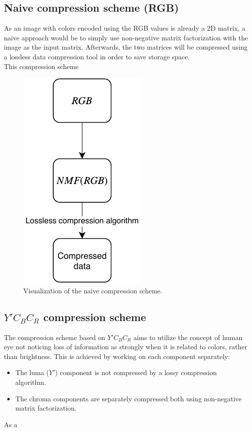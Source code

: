 \documentclass[thesis=M,english]{FITthesis}[2012/10/20]
\begin{document}
\subsection{Naive compression scheme (RGB)}
As an image with colors encoded using the RGB values is already
a 2D matrix, a naive approach would be to simply use non-negative
matrix factorization with the image as the input matrix. Afterwards,
the two matrices will be compressed using a lossless data compression
tool in order to save storage space.
\\

This compression scheme 

\begin{figure}[h]
  \centering
  \includegraphics{nmf-naive-scheme}
  \caption{Visualization of the naive compression scheme.}
  \label{fig:nmf-naive-scheme}
\end{figure}


\subsection{$Y'C_BC_R$ compression scheme}
The compression scheme based on $Y'C_BC_R$ aims to utilize the concept
of human eye not noticing loss of information as strongly when it is related
to colors, rather than brightness. This is achieved by working on each component
separately:
\begin{itemize}
  \item The luma ($Y'$) component is not compressed by a lossy compression algorithm.
  \item The chroma components are separately compressed both using non-negative
   matrix factorization.
\end{itemize}
As a 
\end{document}
